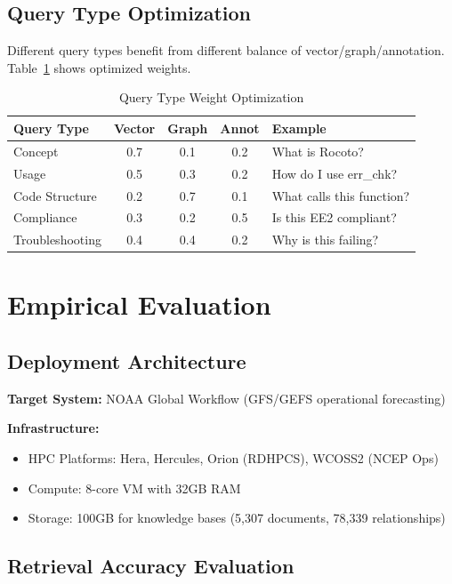 \documentclass[11pt,letterpaper]{article}
\begin{document}
\subsection{Query Type Optimization}

Different query types benefit from different balance of vector/graph/annotation. Table~\ref{tab:query-weights} shows optimized weights.

\begin{table}[h]
\centering
\caption{Query Type Weight Optimization}
\label{tab:query-weights}
\begin{tabular}{@{}lcccp{3.5cm}@{}}
\toprule
\textbf{Query Type} & \textbf{Vector} & \textbf{Graph} & \textbf{Annot} & \textbf{Example} \\
\midrule
Concept & 0.7 & 0.1 & 0.2 & What is Rocoto? \\
Usage & 0.5 & 0.3 & 0.2 & How do I use err\_chk? \\
Code Structure & 0.2 & 0.7 & 0.1 & What calls this function? \\
Compliance & 0.3 & 0.2 & 0.5 & Is this EE2 compliant? \\
Troubleshooting & 0.4 & 0.4 & 0.2 & Why is this failing? \\
\bottomrule
\end{tabular}
\end{table}

\section{Empirical Evaluation}
\label{sec:evaluation}

\subsection{Deployment Architecture}

\textbf{Target System:} NOAA Global Workflow (GFS/GEFS operational forecasting)

\textbf{Infrastructure:}
\begin{itemize}
    \item HPC Platforms: Hera, Hercules, Orion (RDHPCS), WCOSS2 (NCEP Ops)
    \item Compute: 8-core VM with 32GB RAM
    \item Storage: 100GB for knowledge bases (5,307 documents, 78,339 relationships)
\end{itemize}

\subsection{Retrieval Accuracy Evaluation}
\end{document}
